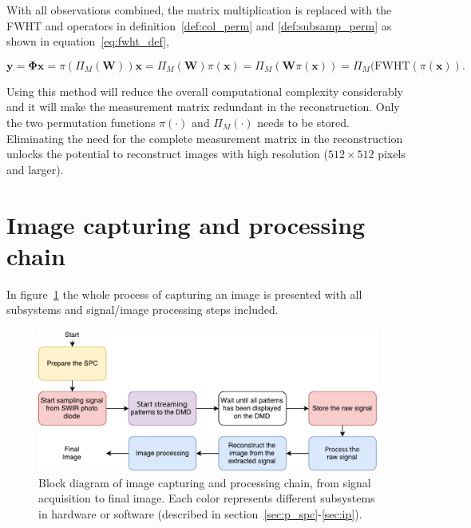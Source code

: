 With all observations combined, the matrix multiplication is replaced with the FWHT and operators in definition~\ref{def:col_perm} and \ref{def:subsamp_perm} as shown in equation~\ref{eq:fwht_def},

\begin{equation}
\mathbf{y} = \mathbf{\Phi}\mathbf{x} = \pi(\Pi_M(\mathbf{W}))\mathbf{x} = \Pi_M(\mathbf{W})\pi(\mathbf{x}) = \Pi_M(\mathbf{W}\pi(\mathbf{x})) = \Pi_M(\text{FWHT}(\pi(\mathbf{x}))\text{.}
\label{eq:fwht_def}
\end{equation}

Using this method will reduce the overall computational complexity considerably and it will make the measurement matrix redundant in the reconstruction. Only the two permutation functions $\pi(\cdot) \text{ and } \Pi_M(\cdot)$ needs to be stored. Eliminating the need for the complete measurement matrix in the reconstruction unlocks the potential to reconstruct images with high resolution ($512\times512$ pixels and larger). \cite{article:SRM_long, article:TVAL3}



\section{Image capturing and processing chain}
\label{sec:image_capturing_and_process_chain}
In figure~\ref{fig:flow_chart} the whole process of capturing an image is presented with all subsystems and signal/image processing steps included.

\begin{figure}[H]
\includegraphics[width = 1\linewidth]{gfx/flowchart3.pdf}
\caption{Block diagram of image capturing and processing chain, from signal acquisition to final image. Each color represents different subsystems in hardware or software (described in section~\ref{sec:p_spc}-\ref{sec:ip}).}
	\label{fig:flow_chart}
\end{figure}

